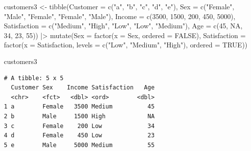 \documentclass[
  ignorenonframetext,
]{beamer}
\newenvironment{Shaded}{\begin{snugshade}}{\end{snugshade}}
\newcommand{\AttributeTok}[1]{\textcolor[rgb]{0.40,0.45,0.13}{#1}}
\newcommand{\ConstantTok}[1]{\textcolor[rgb]{0.56,0.35,0.01}{#1}}
\newcommand{\DecValTok}[1]{\textcolor[rgb]{0.68,0.00,0.00}{#1}}
\newcommand{\FunctionTok}[1]{\textcolor[rgb]{0.28,0.35,0.67}{#1}}
\newcommand{\NormalTok}[1]{\textcolor[rgb]{0.00,0.23,0.31}{#1}}
\newcommand{\OtherTok}[1]{\textcolor[rgb]{0.00,0.23,0.31}{#1}}
\newcommand{\SpecialCharTok}[1]{\textcolor[rgb]{0.37,0.37,0.37}{#1}}
\newcommand{\StringTok}[1]{\textcolor[rgb]{0.13,0.47,0.30}{#1}}
\begin{document}
\begin{frame}[fragile]{}
\label{section-20}
\tiny

\begin{Shaded}
\begin{Highlighting}[]
\NormalTok{customers3 }\OtherTok{\textless{}{-}} \FunctionTok{tibble}\NormalTok{(}\AttributeTok{Customer =} \FunctionTok{c}\NormalTok{(}\StringTok{"a"}\NormalTok{, }\StringTok{"b"}\NormalTok{, }\StringTok{"c"}\NormalTok{, }\StringTok{"d"}\NormalTok{, }\StringTok{"e"}\NormalTok{),}
                     \AttributeTok{Sex =} \FunctionTok{c}\NormalTok{(}\StringTok{"Female"}\NormalTok{, }\StringTok{"Male"}\NormalTok{, }\StringTok{"Female"}\NormalTok{, }\StringTok{"Female"}\NormalTok{, }\StringTok{"Male"}\NormalTok{),}
                     \AttributeTok{Income =} \FunctionTok{c}\NormalTok{(}\DecValTok{3500}\NormalTok{, }\DecValTok{1500}\NormalTok{, }\DecValTok{200}\NormalTok{, }\DecValTok{450}\NormalTok{, }\DecValTok{5000}\NormalTok{),}
                     \AttributeTok{Satisfaction =} \FunctionTok{c}\NormalTok{(}\StringTok{"Medium"}\NormalTok{, }\StringTok{"High"}\NormalTok{, }\StringTok{"Low"}\NormalTok{, }\StringTok{"Low"}\NormalTok{, }\StringTok{"Medium"}\NormalTok{),}
                     \AttributeTok{Age =} \FunctionTok{c}\NormalTok{(}\DecValTok{45}\NormalTok{, }\ConstantTok{NA}\NormalTok{, }\DecValTok{34}\NormalTok{, }\DecValTok{23}\NormalTok{, }\DecValTok{55}\NormalTok{)) }\SpecialCharTok{|\textgreater{}} 
  \FunctionTok{mutate}\NormalTok{(}\AttributeTok{Sex =} \FunctionTok{factor}\NormalTok{(}\AttributeTok{x =}\NormalTok{ Sex, }
                      \AttributeTok{ordered =} \ConstantTok{FALSE}\NormalTok{),}
         \AttributeTok{Satisfaction =} \FunctionTok{factor}\NormalTok{(}\AttributeTok{x =}\NormalTok{ Satisfaction, }
                               \AttributeTok{levels =} \FunctionTok{c}\NormalTok{(}\StringTok{"Low"}\NormalTok{, }\StringTok{"Medium"}\NormalTok{, }\StringTok{"High"}\NormalTok{),}
                               \AttributeTok{ordered =} \ConstantTok{TRUE}\NormalTok{))}

\NormalTok{customers3}
\end{Highlighting}
\end{Shaded}

\begin{verbatim}
# A tibble: 5 x 5
  Customer Sex    Income Satisfaction   Age
  <chr>    <fct>   <dbl> <ord>        <dbl>
1 a        Female   3500 Medium          45
2 b        Male     1500 High            NA
3 c        Female    200 Low             34
4 d        Female    450 Low             23
5 e        Male     5000 Medium          55
\end{verbatim}
\end{frame}
\end{document}
